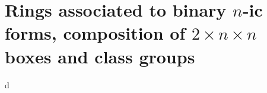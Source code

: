 
\section{Rings associated to binary $n$-ic forms, composition of $2\times n\times n$ boxes and class groups}





d


